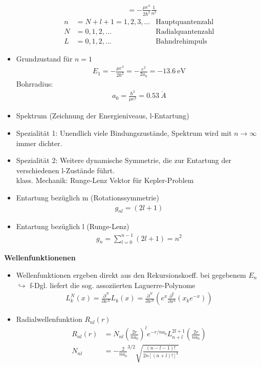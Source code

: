 \documentclass[10pt,article,colorback,accentcolor=tud9d]{scrartcl}
\begin{document}
\begin{itemize}
\begin{align}
    &=-\frac{\mu e^4}{2\hbar^2}\frac{1}{n^2}
    \end{align}
    \begin{align}
    n&=N+l+1=1,2,3,...&\text{Hauptquantenzahl}\\
    N&=0,1,2,...&\text{Radialquantenzahl}\\
    L&=0,1,2,... &\text{Bahndrehimpuls}
    \end{align}
  \item Grundzustand für $n=1$ 
    \begin{align}
    E_1=-\frac{\mu e^4}{2\hbar^2}=-\frac{e^2}{2a_0}=-13.6~\text{eV}
    \end{align}
    Bohrradius:
    \begin{align}
    a_0=\frac{\hbar^2}{\mu e^2}=0.53~\mathring{A}
    \end{align}
  \item Spektrum (Zeichnung der Energieniveaus, l-Entartung)
  \item Spezialität 1: Unendlich viele Bindungszustände, Spektrum wird mit $n\rightarrow\infty$ immer dichter.
  \item Spezialität 2: Weitere dynamische Symmetrie, die zur Entartung der verschiedenen l-Zustände führt.\\
    klass. Mechanik: Runge-Lenz Vektor für Kepler-Problem
  \item Entartung bezüglich m (Rotationssymmetrie)
    \begin{align}
    g_{nl}=(2l+1)
    \end{align}
  \item Entartung bezüglich l (Runge-Lenz)
    \begin{align}
    g_n=\sum_{l=0}^{n-1}(2l+1)=n^2
    \end{align}
\end{itemize}


\noindent\textbf{Wellenfunktionenen}

\begin{itemize}
  \item Wellenfunktionen ergeben direkt aus den Rekursionskoeff. bei gegebenem $E_n$\\
    $\hookrightarrow$ f-Dgl. liefert die sog. assoziierten Laguerre-Polynome
    \begin{align}
    L^N_k(x)=\frac{\partial^N}{\partial x^N}L_k(x)=\frac{\partial^N}{\partial x^N}\left(e^x\frac{\partial^k}{\partial x^k}(x_k e^{-x})\right)
    \end{align}
  \item Radialwellenfunktion $R_{nl}(r)$
    \begin{align}
    R_{nl}(r)&=N_{nl}\left(\frac{2r}{na_0}\right)^le^{-r/na_0}L^{2l+1}_{n+l}\left(\frac{2r}{na_0}\right)\\
    N_{nl}&=-\frac{2}{na_0}^{3/2}\sqrt{\frac{(n-l-1)!}{2n[(n+l)!]^3}}
    \end{align}
\end{itemize}
\end{document}
